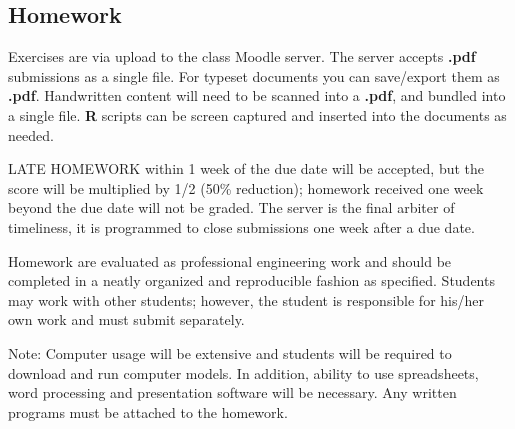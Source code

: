 \documentclass[12pt]{article}
\begin{document}
\subsection*{Homework}
Exercises are via upload to the class Moodle server.  The server accepts \textbf{.pdf} submissions as a single file.  For typeset documents you can save/export them as \textbf{.pdf}.  Handwritten content will need to be scanned into a \textbf{.pdf}, and bundled into a single file.   \textbf{R} scripts can be screen captured and inserted into the documents as needed. 

LATE HOMEWORK within 1 week of the due date will be accepted, but the score will be multiplied by 1/2 (50\% reduction); homework received one week beyond the due date will not be graded.  The server is the final arbiter of timeliness, it is programmed to close submissions one week after a due date.

Homework are evaluated as professional engineering work and should be completed in a neatly organized and
reproducible fashion as specified. Students may work with other students; however, the student is responsible for his/her own work and must submit separately. 

Note: Computer usage will be extensive and students will be required to download and run
computer models. In addition, ability to use spreadsheets, word processing and presentation
software will be necessary. Any written programs must be attached to the homework.

\end{document}
